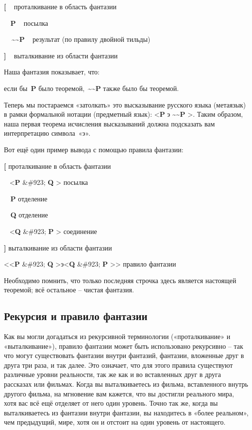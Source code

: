 \documentclass[../main.tex]{subfiles}
\begin{document}
\textbf{{[}} ~ проталкивание в область фантазии

\textbf{~ P} ~ посылка

\textbf{~~\textasciitilde\textasciitilde P} ~ результат (по правилу двойной тильды)

\textbf{{]}} ~ выталкивание из области фантазии

Наша фантазия показывает, что:

если бы~\textbf{P} было теоремой,~\textbf{\textasciitilde\textasciitilde P} также было бы теоремой.

Теперь мы постараемся «затолкать» это высказывание русского языка (метаязык) в рамки формальной нотации (предметный язык): \textless{}\textbf{P} э \textbf{\textasciitilde\textasciitilde P} \textgreater. Таким образом, наша первая теорема исчисления высказываний должна подсказать вам интерпретацию символа~«э».

Вот ещё один пример вывода с помощью правила фантазии:

\textbf{{[}} проталкивание в область фантазии

~ \textless{}\textbf{P} \&\#923; \textbf{Q} \textgreater{} посылка

\textbf{~ P} отделение

\textbf{~ Q} отделение

~ \textless{}\textbf{Q} \&\#923; \textbf{P} \textgreater{} соединение

\textbf{{]}} выталкивание из области фантазии

\textless\textless{}\textbf{P} \&\#923; \textbf{Q} \textgreater э\textless{}\textbf{Q} \&\#923; \textbf{P} \textgreater\textgreater{} правило фантазии

Необходимо помнить, что только последняя строчка здесь является настоящей теоремой; всё остальное \--- чистая фантазия.


\subsection{Рекурсия и правило фантазии}

Как вы могли догадаться из рекурсивной терминологии («проталкивание» и «выталкивание»), правило фантазии может быть использовано рекурсивно \--- так что могут существовать фантазии внутри фантазий, фантазии, вложенные друг в друга три раза, и так далее. Это означает, что для этого правила существуют различные уровни реальности, так же как и во вставленных друг в друга рассказах или фильмах. Когда вы выталкиваетесь из фильма, вставленного внутрь другого фильма, на мгновение вам кажется, что вы достигли реального мира, хотя вас всё ещё отделяет от него один уровень. Точно так же, когда вы выталкиваетесь из фантазии внутри фантазии, вы находитесь в «более реальном», чем предыдущий, мире, хотя он и отстоит на один уровень от настоящего.
\end{document}
